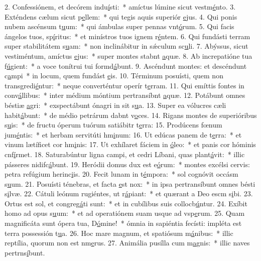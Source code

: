 2. Confessiónem, et decórem indu\uline{í}sti:~* amíctus lúmine sicut vestm\uline{é}nto.
3. Exténdens cælum sicut p\uline{e}llem:~* qui tegis aquis superiór \uline{e}jus.
4. Qui ponis nubem ascénsum t\uline{u}um:~* qui ámbulas super pennas vnt\uline{ó}rum.
5. Qui facis ángelos tuos, sp\uline{í}ritus:~* et minístros tuos ignem r\uline{é}ntem.
6. Qui fundásti terram super stabilitátem s\uline{u}am:~* non inclinábitur in sǽculum sc\uline{u}li.
7. Abýssus, sicut vestiméntum, amíctus \uline{e}jus:~* super montes stabnt \uline{a}quæ.
8. Ab increpatióne tua f\uline{ú}gient:~* a voce tonítrui tui formd\uline{á}bunt.
9. Ascéndunt montes: et descéndunt c\uline{a}mpi~* in locum, quem fundást \uline{e}is.
10. Términum posuísti, quem non transgredi\uline{é}ntur:~* neque converténtur operír t\uline{e}rram.
11. Qui emíttis fontes in conv\uline{á}llibus:~* inter médium móntium pertransíbnt \uline{a}quæ.
12. Potábunt omnes béstiæ \uline{a}gri:~* exspectábunt ónagri in sit s\uline{u}a.
13. Super ea vólucres cæli habit\uline{á}bunt:~* de médio petrárum dabnt v\uline{o}ces.
14. Rigans montes de superióribus s\uline{u}is:~* de fructu óperum tuórum satiábitr t\uline{e}rra:
15. Prodúcens fœnum jum\uline{é}ntis:~* et herbam servitúti hm\uline{i}num:
16. Ut edúcas panem de t\uline{e}rra:~* et vinum lætíficet cor hm\uline{i}nis:
17. Ut exhílaret fáciem in \uline{ó}leo:~* et panis cor hóminis cnf\uline{í}rmet.
18. Saturabúntur ligna campi, et cedri Líbani, quas plant\uline{á}vit:~* illic pásseres nidifc\uline{á}bunt.
19. Heródii domus dux est e\uline{ó}rum:~* montes excélsi cervis: petra refúgium herinc\uline{i}is.
20. Fecit lunam in t\uline{é}mpora:~* sol cognóvit occásm s\uline{u}um.
21. Posuísti ténebras, et facta \uline{e}st nox:~* in ipsa pertransíbunt omnes bésti s\uline{i}lvæ.
22. Cátuli leónum rugiéntes, ut r\uline{á}piant:~* et quærant a Deo escm s\uline{i}bi.
23. Ortus est sol, et congreg\uline{á}ti sunt:~* et in cubílibus suis collocb\uline{ú}ntur.
24. Exíbit homo ad opus s\uline{u}um:~* et ad operatiónem suam usque ad vsp\uline{e}rum.
25. Quam magnificáta sunt ópera tua, D\uline{ó}mine!~* ómnia in sapiéntia fecísti: impléta est terra possessión t\uline{u}a.
26. Hoc mare magnum, et spatiósum m\uline{á}nibus:~* illic reptília, quorum non est nm\uline{e}rus.
27. Animália pusílla cum m\uline{a}gnis:~* illic naves pertrns\uline{í}bunt.
